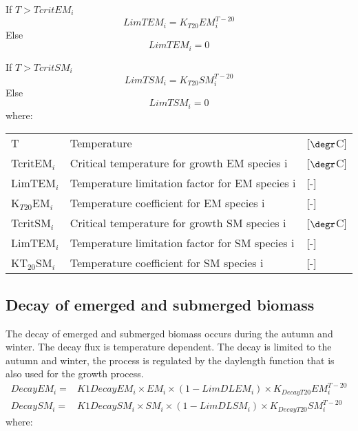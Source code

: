 If $T > TcritEM_i$
%
\begin{equation}
\nonumber    LimTEM_i = K_{T20}EM_i^{T-20}
\end{equation}
%
Else
\begin{equation}
    LimTEM_i = 0
\end{equation}

If $T > TcritSM_i$
%
\begin{equation}
\nonumber    LimTSM_i = K_{T20}SM_i^{T-20}
\end{equation}
%
Else
\begin{equation}
    LimTSM_i = 0
\end{equation}
%
where:

\begin{tabular}{lll}
T                 & Temperature                                     & [$\degr$C]      \\
TcritEM$_i$       & Critical temperature for growth EM species i    & [$\degr$C]      \\
LimTEM$_i$        & Temperature limitation factor for EM species i  & [-]               \\
K$_{T20}$EM$_i$   & Temperature coefficient for EM species i        & [-]               \\
TcritSM$_i$       & Critical temperature for growth SM species i    & [$\degr$C]      \\
LimTEM$_i$        & Temperature limitation factor for SM species i  & [-]               \\
KT$_{20}$SM$_i$   & Temperature coefficient for SM species i        & [-]               \\
\end{tabular}

\subsection{Decay of emerged and submerged biomass}
The decay of emerged and submerged biomass occurs during the autumn and winter. The decay flux is temperature
dependent. The decay is limited to the autumn and winter, the process is regulated by the daylength function
that is also used for the growth process.
%
\begin{align}
\nonumber DecayEM_i =& K1DecayEM_i \times EM_i \times (1-LimDLEM_i) \times K_{DecayT20}EM_i^{T-20} \\
          DecaySM_i =& K1DecaySM_i \times SM_i \times (1-LimDLSM_i) \times K_{DecayT20}SM_i^{T-20}
\end{align}
%
where:

